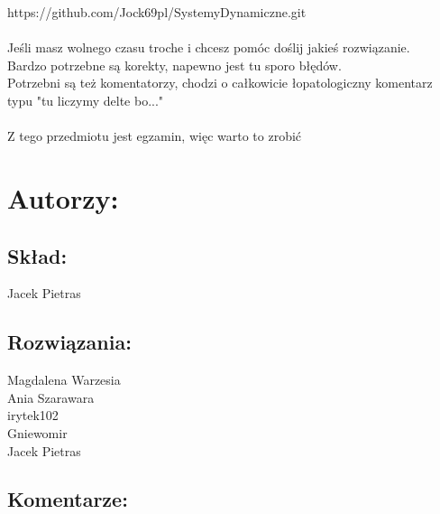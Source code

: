 \documentclass[a4paper,10pt]{article}
\begin{document}
\noindent https://github.com/Jock69pl/SystemyDynamiczne.git\\
\\
Jeśli masz wolnego czasu troche i chcesz pomóc doślij jakieś rozwiązanie.\\
Bardzo potrzebne są korekty, napewno jest tu sporo błędów.\\
Potrzebni są też komentatorzy, chodzi o całkowicie łopatologiczny komentarz typu "tu liczymy delte bo..."\\
\\
Z tego przedmiotu jest egzamin, więc warto to zrobić



\pagebreak
\section*{Autorzy:}

\subsection*{Skład:} 
Jacek Pietras

\subsection*{Rozwiązania:} 
Magdalena Warzesia\\
Ania Szarawara\\
irytek102\\
Gniewomir\\
Jacek Pietras

\subsection*{Komentarze:} 
\end{document}
